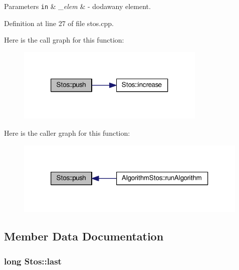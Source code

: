 \begin{DoxyParams}[1]{Parameters}
\mbox{\tt in}  & {\em \-\_\-elem} & -\/ dodawany element. \\
\hline
\end{DoxyParams}


Definition at line 27 of file stos.\-cpp.



Here is the call graph for this function\-:\nopagebreak
\begin{figure}[H]
\begin{center}
\leavevmode
\includegraphics[width=256pt]{class_stos_afd5802e405946328cccca3eed676b493_cgraph}
\end{center}
\end{figure}




Here is the caller graph for this function\-:\nopagebreak
\begin{figure}[H]
\begin{center}
\leavevmode
\includegraphics[width=316pt]{class_stos_afd5802e405946328cccca3eed676b493_icgraph}
\end{center}
\end{figure}




\subsection{Member Data Documentation}
\hypertarget{class_stos_ae0623cdf9b6725e38da86b74972d61ba}{
\subsubsection[{last}]{\setlength{\rightskip}{0pt plus 5cm}long Stos\-::last\hspace{0.3cm}{\ttfamily [private]}}}\label{class_stos_ae0623cdf9b6725e38da86b74972d61ba}


